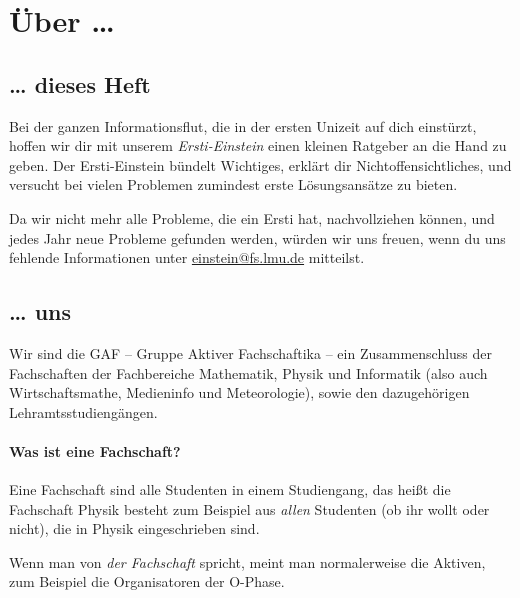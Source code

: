 \documentclass[twoside,12pt,parskip=half-]{scrartcl}
\begin{document}
\clearpage


\setcounter{page}{1}

\vspace*{0.02cm}
\tableofcontents
\clearpage

\def\mail#1{\url{#1}}

\section{Über \ldots}

\subsection{\ldots{} dieses Heft}

Bei der ganzen Informationsflut, die in der ersten Unizeit auf dich
einstürzt, hoffen wir dir mit unserem \emph{Ersti-Einstein} einen
kleinen Ratgeber an die Hand zu geben.  Der Ersti-Einstein bündelt
Wichtiges, erklärt dir Nichtoffensichtliches, und versucht bei vielen
Problemen zumindest erste Lösungsansätze zu bieten.

Da wir nicht mehr alle Probleme, die ein Ersti hat, nachvollziehen
können, und jedes Jahr neue Probleme gefunden werden, würden wir uns
freuen, wenn du uns fehlende Informationen unter
\mail{einstein@fs.lmu.de} mitteilst.


\subsection{\ldots{} uns}

Wir sind die GAF -- Gruppe Aktiver Fachschaftika -- ein
Zusammenschluss der Fachschaften der Fachbereiche
Mathematik,
Physik
und Informatik (also auch Wirtschaftsmathe, Medieninfo und
Meteorologie), sowie den dazugehörigen Lehramtsstudiengängen.

\paragraph{Was ist eine Fachschaft?}

Eine Fachschaft sind alle Studenten in einem Studiengang, das heißt die Fachschaft Physik besteht zum Beispiel aus \emph{allen} Studenten (ob ihr wollt oder nicht), die in Physik eingeschrieben sind.

Wenn man von \emph{der Fachschaft} spricht, meint man normalerweise die Aktiven,
zum Beispiel die Organisatoren der O-Phase.
\end{document}
